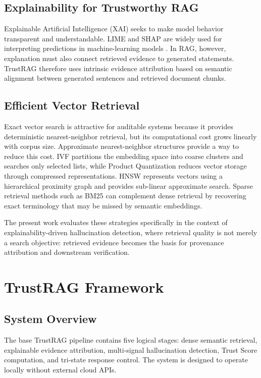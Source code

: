 \documentclass[conference]{IEEEtran}
\begin{document}
\subsection{Explainability for Trustworthy RAG}

Explainable Artificial Intelligence (XAI) seeks to make model behavior transparent and understandable. LIME and SHAP are widely used for interpreting predictions in machine-learning models \cite{ribeiro2016,lundberg2017}. In RAG, however, explanation must also connect retrieved evidence to generated statements. TrustRAG therefore uses intrinsic evidence attribution based on semantic alignment between generated sentences and retrieved document chunks.

\subsection{Efficient Vector Retrieval}

Exact vector search is attractive for auditable systems because it provides deterministic nearest-neighbor retrieval, but its computational cost grows linearly with corpus size. Approximate nearest-neighbor structures provide a way to reduce this cost. IVF partitions the embedding space into coarse clusters and searches only selected lists, while Product Quantization reduces vector storage through compressed representations. HNSW represents vectors using a hierarchical proximity graph and provides sub-linear approximate search. Sparse retrieval methods such as BM25 can complement dense retrieval by recovering exact terminology that may be missed by semantic embeddings.

The present work evaluates these strategies specifically in the context of explainability-driven hallucination detection, where retrieval quality is not merely a search objective: retrieved evidence becomes the basis for provenance attribution and downstream verification.

\section{TrustRAG Framework}

\subsection{System Overview}

The base TrustRAG pipeline contains five logical stages: dense semantic retrieval, explainable evidence attribution, multi-signal hallucination detection, Trust Score computation, and tri-state response control. The system is designed to operate locally without external cloud APIs.
\end{document}
